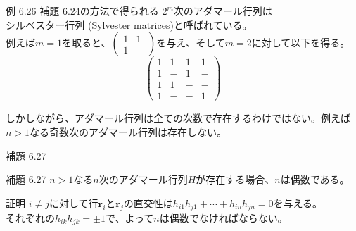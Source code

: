 \documentclass[dvipdfmx,10pt,jsarticle]{beamer}
\begin{document}
  \begin{frame}{例 6.26}
    補題 6.24の方法で得られる $2^m$次のアダマール行列は \\シルベスター行列 (Sylvester matrices)と呼ばれている。\\
    例えば$m = 1$を取ると、$\begin{pmatrix} 1 & 1 \\ 1 & - \end{pmatrix}$を与え、そして$m = 2$に対して以下を得る。
      \[ \begin{pmatrix}
          1 & 1 & 1 & 1 \\
          1 & - & 1 & - \\
          1 & 1 & - & - \\
          1 & - & - & 1
      \end{pmatrix} \]

    しかしながら、アダマール行列は全ての次数で存在するわけではない。例えば$n > 1$なる奇数次のアダマール行列は存在しない。
  \end{frame}

  \begin{frame}{補題 6.27}
    \begin{block}{補題 6.27}
      $n > 1$なる$n$次のアダマール行列$H$が存在する場合、$n$は偶数である。
    \end{block}

      \begin{block}{証明}
        $i \neq j$に対して行$\mathbf{r}_i$と$\mathbf{r}_j$の直交性は$h_{i1}h_{j1} + \cdots + h_{in}h_{jn} = 0$を与える。 \\
        それぞれの$h_{ik}h_{jk} = \pm1$で、よって$n$は偶数でなければならない。
      \end{block}
  \end{frame}
\end{document}

